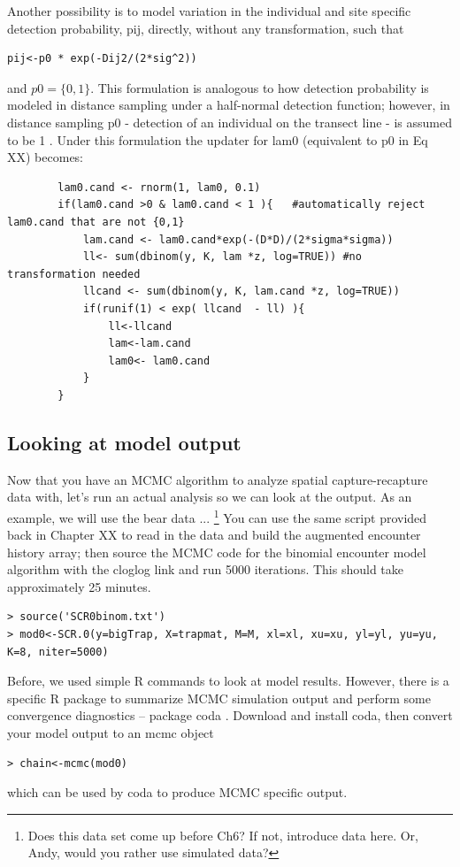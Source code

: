 Another possibility is to model variation in the individual and site specific detection probability, pij, directly, without any transformation, such that
\begin{verbatim}
pij<-p0 * exp(-Dij2/(2*sig^2))
\end{verbatim}
and $p0 = \{0,1\}$.
This formulation is analogous to how detection probability is modeled in distance sampling under a half-normal detection function; however, in distance sampling p0 - detection of an individual on the transect line - is assumed to be 1 \citep{buckland_etal:2001}. Under this formulation the updater for lam0 (equivalent to p0 in Eq XX) becomes:
\begin{verbatim}
        lam0.cand <- rnorm(1, lam0, 0.1)
        if(lam0.cand >0 & lam0.cand < 1 ){   #automatically reject lam0.cand that are not {0,1}
            lam.cand <- lam0.cand*exp(-(D*D)/(2*sigma*sigma))
            ll<- sum(dbinom(y, K, lam *z, log=TRUE)) #no transformation needed
            llcand <- sum(dbinom(y, K, lam.cand *z, log=TRUE))
            if(runif(1) < exp( llcand  - ll) ){
                ll<-llcand
                lam<-lam.cand
                lam0<- lam0.cand
            }
        }
\end{verbatim}


\subsection{Looking at model output}
Now that you have an MCMC algorithm to analyze spatial capture-recapture data with, let's run an actual analysis so we can look at the output. As an example, we will use the bear data ... \footnote{Does this data set come up before Ch6? If not, introduce data here. Or, Andy, would you rather use simulated data?} You can use the same script provided back in Chapter XX to read in the data and build the augmented encounter history array; then source the MCMC code for the binomial encounter model algorithm with the cloglog link and run 5000 iterations. This should take approximately 25 minutes.
\begin{verbatim}
> source('SCR0binom.txt')
> mod0<-SCR.0(y=bigTrap, X=trapmat, M=M, xl=xl, xu=xu, yl=yl, yu=yu, K=8, niter=5000)
\end{verbatim}

Before, we used simple R commands to look at model results. However, there is a specific R package to summarize MCMC simulation output and perform some convergence diagnostics – package coda \citep{plummer_etal:2006}. Download and install coda, then convert your model output to an mcmc object
\begin{verbatim}
> chain<-mcmc(mod0)
\end{verbatim} which can be used by coda to produce MCMC specific output.

